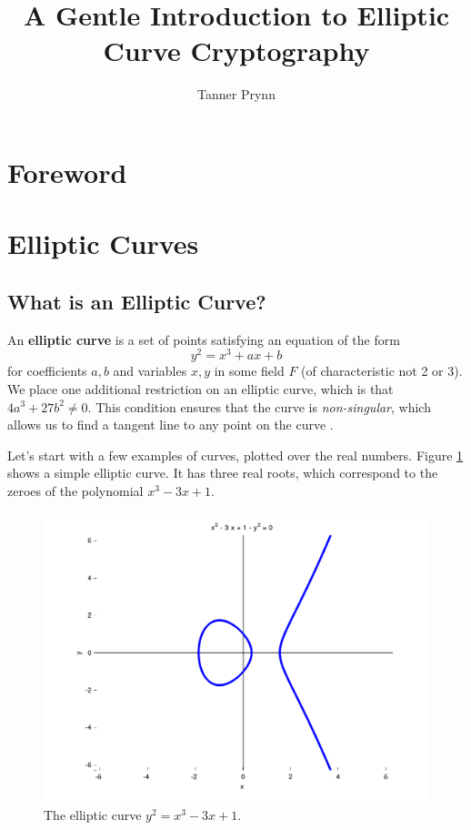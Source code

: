 \documentclass{article}
\begin{document}
\title{A Gentle Introduction to Elliptic Curve Cryptography}
\author{Tanner Prynn}
\maketitle

\tableofcontents
\clearpage

\section*{Foreword}

\section{Elliptic Curves}

\subsection{What is an Elliptic Curve?}
An \textbf{elliptic curve} is a set of points satisfying an equation of the form
$$y^2 = x^3 + ax + b$$
for coefficients $a,b$ and variables $x,y$ in some field $F$ (of characteristic not 2 or 3). 
We place one additional restriction on an elliptic curve, which is that
$4a^3 + 27b^2 \neq 0$.
This condition ensures that the curve is \textit{non-singular}, which allows us to find a tangent line to any point on the curve \cite[$\S$3.1]{ecc-guide}.

Let's start with a few examples of curves, plotted over the real numbers.
Figure \ref{fig:ec-plot} shows a simple elliptic curve.
It has three real roots, which correspond to the zeroes of the polynomial $x^3 - 3x + 1$.

\begin{figure}[h]
\centering
\includegraphics[width=.7\textwidth]{images/ec1.png}
\caption{The elliptic curve $y^2 = x^3 - 3x + 1$.}
\label{fig:ec-plot}
\end{figure}
\end{document}
